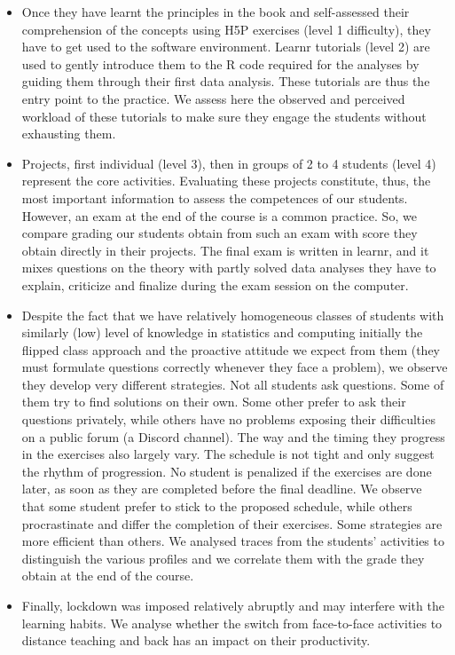 \documentclass[
]{article}
\begin{document}
\begin{itemize}
\item
  Once they have learnt the principles in the book and self-assessed
  their comprehension of the concepts using H5P exercises (level 1
  difficulty), they have to get used to the software environment. Learnr
  tutorials (level 2) are used to gently introduce them to the R code
  required for the analyses by guiding them through their first data
  analysis. These tutorials are thus the entry point to the practice. We
  assess here the observed and perceived workload of these tutorials to
  make sure they engage the students without exhausting them.
\item
  Projects, first individual (level 3), then in groups of 2 to 4
  students (level 4) represent the core activities. Evaluating these
  projects constitute, thus, the most important information to assess
  the competences of our students. However, an exam at the end of the
  course is a common practice. So, we compare grading our students
  obtain from such an exam with score they obtain directly in their
  projects. The final exam is written in learnr, and it mixes questions
  on the theory with partly solved data analyses they have to explain,
  criticize and finalize during the exam session on the computer.
\item
  Despite the fact that we have relatively homogeneous classes of
  students with similarly (low) level of knowledge in statistics and
  computing initially the flipped class approach and the proactive
  attitude we expect from them (they must formulate questions correctly
  whenever they face a problem), we observe they develop very different
  strategies. Not all students ask questions. Some of them try to find
  solutions on their own. Some other prefer to ask their questions
  privately, while others have no problems exposing their difficulties
  on a public forum (a Discord channel). The way and the timing they
  progress in the exercises also largely vary. The schedule is not tight
  and only suggest the rhythm of progression. No student is penalized if
  the exercises are done later, as soon as they are completed before the
  final deadline. We observe that some student prefer to stick to the
  proposed schedule, while others procrastinate and differ the
  completion of their exercises. Some strategies are more efficient than
  others. We analysed traces from the students' activities to
  distinguish the various profiles and we correlate them with the grade
  they obtain at the end of the course.
\item
  Finally, lockdown was imposed relatively abruptly and may interfere
  with the learning habits. We analyse whether the switch from
  face-to-face activities to distance teaching and back has an impact on
  their productivity.
\end{itemize}
\end{document}
